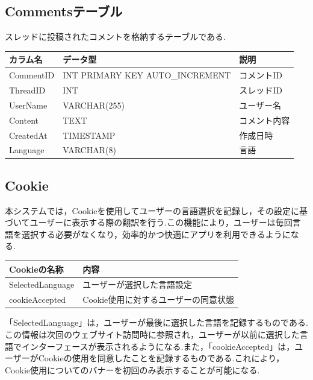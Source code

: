 \documentclass[b5paper,12pt,dvipdfmx]{jsreport}
\begin{document}
\subsection*{Commentsテーブル}

スレッドに投稿されたコメントを格納するテーブルである.

\begin{adjustbox}{width=\textwidth,center}
	\begin{tabular}{lll}
	\toprule
	\textbf{カラム名} & \textbf{データ型} & \textbf{説明} \\
	\midrule
	CommentID  & INT PRIMARY KEY AUTO\_INCREMENT & コメントID \\
	ThreadID   & INT & スレッドID \\
	UserName   & VARCHAR(255) & ユーザー名 \\
	Content    & TEXT & コメント内容 \\
	CreatedAt  & TIMESTAMP & 作成日時 \\
	Language   & VARCHAR(8) & 言語 \\
	\bottomrule
	\end{tabular}
\end{adjustbox}
\vspace{1em}

\subsection*{Cookie}

本システムでは，Cookieを使用してユーザーの言語選択を記録し，その設定に基づいてユーザーに表示する際の翻訳を行う.この機能により，ユーザーは毎回言語を選択する必要がなくなり，効率的かつ快適にアプリを利用できるようになる.

\begin{adjustbox}{width=\textwidth,center}
    \begin{tabular}{ll}
    \toprule
    \textbf{Cookieの名称} & \textbf{内容} \\
    \midrule
    SelectedLanguage & ユーザーが選択した言語設定 \\
    cookieAccepted & Cookie使用に対するユーザーの同意状態 \\
    \bottomrule
    \end{tabular}
\end{adjustbox}
\vspace{1em}

「SelectedLanguage」は，ユーザーが最後に選択した言語を記録するものである.この情報は次回のウェブサイト訪問時に参照され，ユーザーが以前に選択した言語でインターフェースが表示されるようになる.また，「cookieAccepted」は，ユーザーがCookieの使用を同意したことを記録するものである.これにより，Cookie使用についてのバナーを初回のみ表示することが可能になる.
\end{document}
